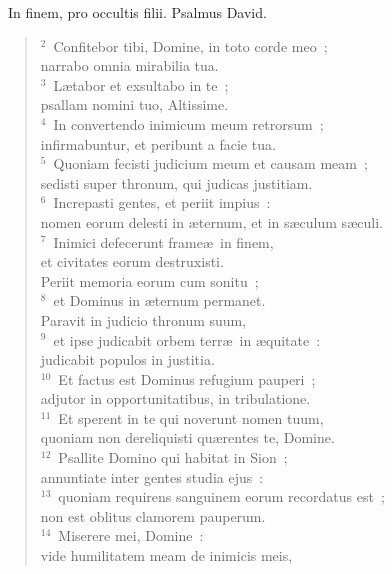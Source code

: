 ~\lettrine[lines=10,image=true,loversize=0.05,lraise=-0.03]{I}{}n finem, pro occultis filii. Psalmus David.
\begin{flushleft}\begin{verse}\vspace{6pt}${}^{2}$~Confitebor tibi, Domine, in toto corde meo~;\\ narrabo omnia mirabilia tua.\\
${}^{3}$~L\ae tabor et exsultabo in te~;\\ psallam nomini tuo, Altissime.\\
${}^{4}$~In convertendo inimicum meum retrorsum~;\\ infirmabuntur, et peribunt a facie tua.\\
${}^{5}$~Quoniam fecisti judicium meum et causam meam~;\\ sedisti super thronum, qui judicas justitiam.\\
${}^{6}$~Increpasti gentes, et periit impius~:\\ nomen eorum delesti in \ae ternum, et in s\ae culum s\ae culi.\\
${}^{7}$~Inimici defecerunt frame\ae\ in finem,\\ et civitates eorum destruxisti.\\ Periit memoria eorum cum sonitu~;\\
${}^{8}$~et Dominus in \ae ternum permanet.\\ Paravit in judicio thronum suum,\\
${}^{9}$~et ipse judicabit orbem terr\ae\ in \ae quitate~:\\ judicabit populos in justitia.\\
${}^{10}$~Et factus est Dominus refugium pauperi~;\\ adjutor in opportunitatibus, in tribulatione.\\
${}^{11}$~Et sperent in te qui noverunt nomen tuum,\\ quoniam non dereliquisti qu\ae rentes te, Domine.\\
${}^{12}$~Psallite Domino qui habitat in Sion~;\\ annuntiate inter gentes studia ejus~:\\
${}^{13}$~quoniam requirens sanguinem eorum recordatus est~;\\ non est oblitus clamorem pauperum.\\
${}^{14}$~Miserere mei, Domine~:\\ vide humilitatem meam de inimicis meis,\\

\end{verse}
\end{flushleft}
